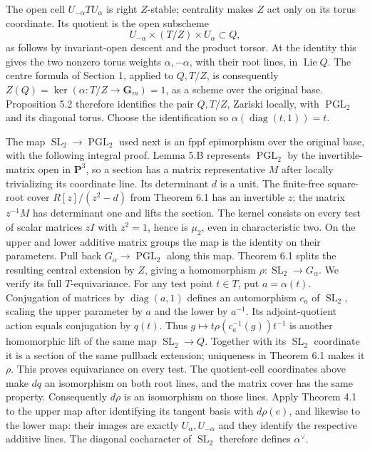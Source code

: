 \documentclass[11pt,a4paper,openany]{report}
\begin{document}
The open cell \(U_{-\alpha}TU_\alpha\) is right \(Z\)-stable; centrality makes \(Z\) act only on its torus coordinate. Its quotient is the open subscheme \[
U_{-\alpha}\times(T/Z)\times U_\alpha\subset Q,
\] as follows by invariant-open descent and the product torsor. At the identity this gives the two nonzero torus weights \(\alpha,-\alpha\), with their root lines, in \(\operatorname{Lie}Q\). The centre formula of Section 1, applied to \(Q,T/Z\), is consequently \(Z(Q)=\ker(\alpha:T/Z\to\mathbf G_m)=1\), as a scheme over the original base. Proposition 5.2 therefore identifies the pair \(Q,T/Z\), Zariski locally, with \(\operatorname{PGL}_2\) and its diagonal torus. Choose the identification so \(\alpha(\operatorname{diag}(t,1))=t\).

The map \(\operatorname{SL}_2\to\operatorname{PGL}_2\) used next is an fppf epimorphism over the original base, with the following integral proof. Lemma 5.B represents \(\operatorname{PGL}_2\) by the invertible-matrix open in \(\mathbf P^3\), so a section has a matrix representative \(M\) after locally trivializing its coordinate line. Its determinant \(d\) is a unit. The finite-free square-root cover \(R[z]/(z^2-d)\) from Theorem 6.1 has an invertible \(z\); the matrix \(z^{-1}M\) has determinant one and lifts the section. The kernel consists on every test of scalar matrices \(zI\) with \(z^2=1\), hence is \(\mu_2\), even in characteristic two. On the upper and lower additive matrix groups the map is the identity on their parameters. Pull back \(G_\alpha\to\operatorname{PGL}_2\) along this map. Theorem 6.1 splits the resulting central extension by \(Z\), giving a homomorphism \(\rho:\operatorname{SL}_2\to G_\alpha\). We verify its full \(T\)-equivariance. For any test point \(t\in T\), put \(a=\alpha(t)\). Conjugation of matrices by \(\operatorname{diag}(a,1)\) defines an automorphism \(c_a\) of \(\operatorname{SL}_2\), scaling the upper parameter by \(a\) and the lower by \(a^{-1}\). Its adjoint-quotient action equals conjugation by \(q(t)\). Thus \(g\mapsto t\rho(c_a^{-1}(g))t^{-1}\) is another homomorphic lift of the same map \(\operatorname{SL}_2\to Q\). Together with its \(\operatorname{SL}_2\) coordinate it is a section of the same pullback extension; uniqueness in Theorem 6.1 makes it \(\rho\). This proves equivariance on every test. The quotient-cell coordinates above make \(dq\) an isomorphism on both root lines, and the matrix cover has the same property. Consequently \(d\rho\) is an isomorphism on those lines. Apply Theorem 4.1 to the upper map after identifying its tangent basis with \(d\rho(e)\), and likewise to the lower map: their images are exactly \(U_\alpha,U_{-\alpha}\) and they identify the respective additive lines. The diagonal cocharacter of \(\operatorname{SL}_2\) therefore defines \(\alpha^\vee\).
\end{document}
